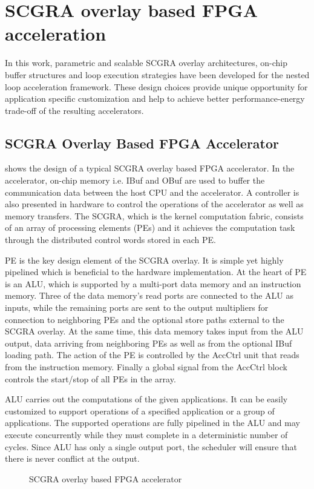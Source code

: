 \section{SCGRA overlay based FPGA acceleration} \label{sec:scgra}
In this work, parametric and scalable SCGRA overlay architectures, 
on-chip buffer structures and loop execution strategies 
have been developed for the nested loop acceleration framework. These 
design choices provide unique opportunity for application specific customization 
and help to achieve better performance-energy trade-off of the resulting accelerators.

\subsection{SCGRA Overlay Based FPGA Accelerator}
 shows the design of a typical SCGRA overlay 
based FPGA accelerator. In the accelerator, on-chip
memory i.e. IBuf and OBuf are used to buffer the communication 
data between the host CPU and the accelerator. A controller is also 
presented in hardware to control the operations of the accelerator as well as
memory transfers. The SCGRA, which is the kernel computation fabric,
consists of an array of processing elements (PEs) and it achieves the computation 
task through the distributed control words stored in each PE. 

PE is the key design element of the SCGRA overlay. It is simple yet 
highly pipelined which is beneficial to the hardware implementation. At the 
heart of PE is an ALU, which is supported by a multi-port data memory and 
an instruction memory. Three of the data memory's read ports are connected 
to the ALU as inputs, while the remaining ports are sent to the output 
multipliers for connection to neighboring PEs and the optional store paths 
external to the SCGRA overlay. At the same time, this data memory takes input 
from the ALU output, data arriving from neighboring PEs as well as from the 
optional IBuf loading path. The action of the PE is controlled by the AccCtrl unit 
that reads from the instruction memory. Finally a global signal from the AccCtrl 
block controls the start/stop of all PEs in the array.

ALU carries out the computations of the given applications. It can be easily customized 
to support operations of a specified application or a group of applications. The supported
operations are fully pipelined in the ALU and may execute concurrently while they must 
complete in a deterministic number of cycles. Since ALU has only a single output port, 
the scheduler will ensure that there is never conflict at the output.
\begin{figure}[tb]
\caption{SCGRA overlay based FPGA accelerator}
\label{fig:scgra-acc}
\end{figure}

